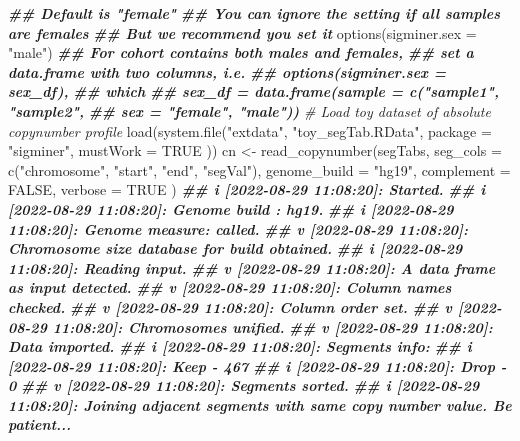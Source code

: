 \documentclass[
  12pt,
  a4paper,
  twoside]{book}
\newenvironment{Shaded}{\begin{snugshade}}{\end{snugshade}}
\newcommand{\AttributeTok}[1]{\textcolor[rgb]{0.77,0.63,0.00}{#1}}
\newcommand{\CommentTok}[1]{\textcolor[rgb]{0.56,0.35,0.01}{\textit{#1}}}
\newcommand{\ConstantTok}[1]{\textcolor[rgb]{0.00,0.00,0.00}{#1}}
\newcommand{\DocumentationTok}[1]{\textcolor[rgb]{0.56,0.35,0.01}{\textbf{\textit{#1}}}}
\newcommand{\FunctionTok}[1]{\textcolor[rgb]{0.00,0.00,0.00}{#1}}
\newcommand{\NormalTok}[1]{#1}
\newcommand{\OtherTok}[1]{\textcolor[rgb]{0.56,0.35,0.01}{#1}}
\newcommand{\StringTok}[1]{\textcolor[rgb]{0.31,0.60,0.02}{#1}}
\begin{document}
\begin{Shaded}
\begin{Highlighting}[]
\DocumentationTok{\#\# Default is "female"}
\DocumentationTok{\#\# You can ignore the setting if all samples are females}
\DocumentationTok{\#\# But we recommend you set it}
\FunctionTok{options}\NormalTok{(}\AttributeTok{sigminer.sex =} \StringTok{"male"}\NormalTok{)}
\DocumentationTok{\#\# For cohort contains both males and females,}
\DocumentationTok{\#\# set a data.frame with two columns, i.e.}
\DocumentationTok{\#\# options(sigminer.sex = sex\_df),}
\DocumentationTok{\#\# which}
\DocumentationTok{\#\# sex\_df = data.frame(sample = c("sample1", "sample2",}
\DocumentationTok{\#\#                     sex = "female", "male"))}
\CommentTok{\# Load toy dataset of absolute copynumber profile}
\FunctionTok{load}\NormalTok{(}\FunctionTok{system.file}\NormalTok{(}\StringTok{"extdata"}\NormalTok{, }\StringTok{"toy\_segTab.RData"}\NormalTok{,}
  \AttributeTok{package =} \StringTok{"sigminer"}\NormalTok{, }\AttributeTok{mustWork =} \ConstantTok{TRUE}
\NormalTok{))}
\NormalTok{cn }\OtherTok{\textless{}{-}} \FunctionTok{read\_copynumber}\NormalTok{(segTabs,}
  \AttributeTok{seg\_cols =} \FunctionTok{c}\NormalTok{(}\StringTok{"chromosome"}\NormalTok{, }\StringTok{"start"}\NormalTok{, }\StringTok{"end"}\NormalTok{, }\StringTok{"segVal"}\NormalTok{),}
  \AttributeTok{genome\_build =} \StringTok{"hg19"}\NormalTok{, }\AttributeTok{complement =} \ConstantTok{FALSE}\NormalTok{, }\AttributeTok{verbose =} \ConstantTok{TRUE}
\NormalTok{)}
\DocumentationTok{\#\# i [2022{-}08{-}29 11:08:20]: Started.}
\DocumentationTok{\#\# i [2022{-}08{-}29 11:08:20]: Genome build  : hg19.}
\DocumentationTok{\#\# i [2022{-}08{-}29 11:08:20]: Genome measure: called.}
\DocumentationTok{\#\# v [2022{-}08{-}29 11:08:20]: Chromosome size database for build obtained.}
\DocumentationTok{\#\# i [2022{-}08{-}29 11:08:20]: Reading input.}
\DocumentationTok{\#\# v [2022{-}08{-}29 11:08:20]: A data frame as input detected.}
\DocumentationTok{\#\# v [2022{-}08{-}29 11:08:20]: Column names checked.}
\DocumentationTok{\#\# v [2022{-}08{-}29 11:08:20]: Column order set.}
\DocumentationTok{\#\# v [2022{-}08{-}29 11:08:20]: Chromosomes unified.}
\DocumentationTok{\#\# v [2022{-}08{-}29 11:08:20]: Data imported.}
\DocumentationTok{\#\# i [2022{-}08{-}29 11:08:20]: Segments info:}
\DocumentationTok{\#\# i [2022{-}08{-}29 11:08:20]:     Keep {-} 467}
\DocumentationTok{\#\# i [2022{-}08{-}29 11:08:20]:     Drop {-} 0}
\DocumentationTok{\#\# v [2022{-}08{-}29 11:08:20]: Segments sorted.}
\DocumentationTok{\#\# i [2022{-}08{-}29 11:08:20]: Joining adjacent segments with same copy number value. Be patient...}

\end{Highlighting}
\end{Shaded}
\end{document}
